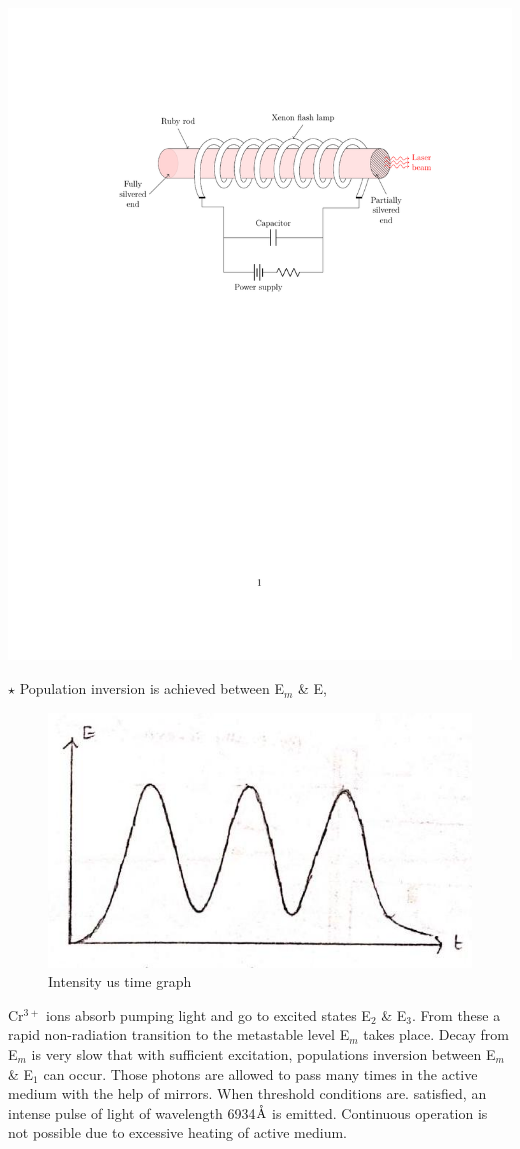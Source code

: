 \documentclass[12pt, a4paper]{article}
\begin{document}
\begin{center}
	\includegraphics[max width=\textwidth]{ruby-laser}
\end{center}

$\star$ Population inversion is achieved between E$_m$ \& E,
\begin{figure}
	\includegraphics[max width=.5\linewidth]{2024_06_16_30d750483617f1939202g-03}
	\caption*{Intensity us time graph}
\end{figure}

Cr$^{3+}$ ions absorb pumping light and go to excited states E$_2$ \& E$_3$. From these a rapid non-radiation transition to the metastable level E$_m$ takes place. Decay from E$_m$ is very slow that with sufficient excitation, populations inversion between E$_m$ \& E$_1$ can occur. Those photons are allowed to pass many times in the active medium with the help of mirrors. When threshold conditions are. satisfied, an intense pulse of light of wavelength 6934$\mathring{\textrm{A}}$ is emitted. Continuous operation is not possible due to excessive heating of active medium.
\end{document}
